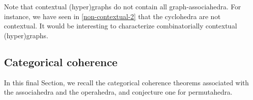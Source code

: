 
\begin{rem}
  Note that contextual (hyper)graphs do not contain all graph-associahedra.
  For instance, we have seen in \cref{non-contextual-2} that the cyclohedra are not contextual. 
  It would be interesting to characterize combinatorially contextual (hyper)graphs.
\end{rem}



\subsection{Categorical coherence}
\label{ss:coherence}

In this final Section, we recall the categorical coherence theorems associated with the associahedra and the operahedra, and conjecture one for permutahedra.


